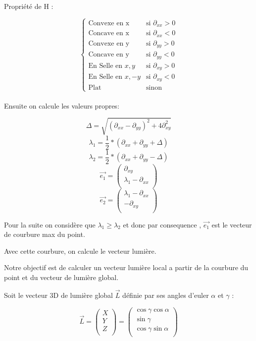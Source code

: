 \documentclass[a4paper]{article}
\begin{document}
Propriété de H :

\[\left\{
    \begin{array}{ll}
        \mbox{Convexe en x } & \mbox{si } \partial_{xx} > 0 \\
       	\mbox{Concave en x } & \mbox{si } \partial_{xx} < 0 \\
       	\mbox{Convexe en y } & \mbox{si } \partial_{yy} > 0 \\
        \mbox{Concave en y } & \mbox{si }  \partial_{yy} < 0 \\
        \mbox{En Selle en } x,y & \mbox{si }  \partial_{xy} > 0 \\
		\mbox{En Selle en } x,-y & \mbox{si } \partial_{xy} < 0 \\
		\mbox{Plat} & \mbox{sinon}				
    \end{array}
\right.
\]
\\

Ensuite on calcule les valeurs propres:

\[ \Delta = \sqrt{(\partial_{xx} - \partial_{yy})^2 + 4\partial_{xy}^2} \]
\[ \lambda_1 = \frac{1}{2} * (\partial_{xx}+\partial_{yy} + \Delta) \]
\[ \lambda_2 = \frac{1}{2} * (\partial_{xx}+\partial_{yy} - \Delta) \]
\[\vec{e_1} = 
\begin{pmatrix}
\partial_{xy} \\
\lambda_1 - \partial_{xx} \\
\end{pmatrix}\] 
\[\vec{e_2} = 
\begin{pmatrix}
\lambda_1 - \partial_{xx} \\
-\partial_{xy} \\
\end{pmatrix}\] 


Pour la suite on considère que $\lambda_1 \geq \lambda_2$  et donc par consequence , $\vec{e_1}$ est le vecteur de courbure max du point. 

Avec cette courbure, on calcule le vecteur lumière. 

Notre objectif est de calculer un vecteur lumière local a partir de la courbure du point et du vecteur de lumière global. 


Soit le vecteur 3D de lumière global $\vec{L}$ définie par ses angles d'euler $\alpha$ et $\gamma$ : 

\[
\vec{L} = 
\begin{pmatrix}
X \\
Y \\
Z \\
\end{pmatrix}
=
\begin{pmatrix}
\cos \gamma  \cos \alpha\\
\sin \gamma \\
\cos \gamma  \sin \alpha \\
\end{pmatrix}
\] 
\end{document}
